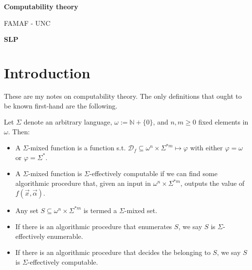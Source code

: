 \documentclass[a4paper, 12pt]{article}
\begin{document}
\begin{titlepage}
   \begin{center}
       \vspace*{1cm}

       \textbf{Computability theory}

       \small
       \vspace{0.5cm}
        FAMAF - UNC
            
       \vspace{1.5cm}
       \footnotesize
       \textbf{SLP}
       \normalsize

       \vfill
            
            
     
   \end{center}
\end{titlepage}


\tableofcontents
\newpage

\section{Introduction}

These are my notes on computability theory. The only definitions that ought to
be known first-hand are the following.

Let $\Sigma$ denote an arbitrary language, $\omega := \mathbb{N} + \{
0\}$, and $n, m \geq 0$ fixed elements in $\omega$. Then: 

\begin{itemize}
    \item A $\Sigma$-mixed function is a function s.t. $\mathcal{D}_f \subseteq
        \omega^n \times \Sigma^{*m} \mapsto \varphi$ with either $\varphi =
        \omega$ or $\varphi = \Sigma^{*}$.
    \item A $\Sigma$-mixed function is $\Sigma$-effectively computable if we can
        find some algorithmic procedure that, given an input in $\omega^n \times
        \Sigma^{*m}$, outputs the value of $f(\overrightarrow{x},
        \overrightarrow{\alpha})$. 
    \item Any set $S \subseteq \omega^{n} \times \Sigma^{*m}$ is termed a
        $\Sigma$-mixed set. 
    \item If there is an algorithmic procedure that enumerates $S$, we say $S$
        is $\Sigma$-effectively enumerable. 

    \item If there is an algorithmic procedure that decides the belonging to
        $S$, we say $S$ is $\Sigma$-effectively computable.
\end{itemize}
\end{document}
